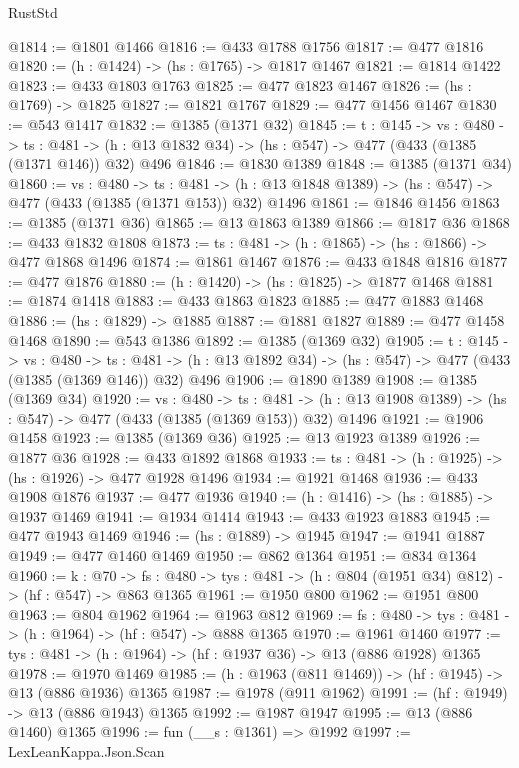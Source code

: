 \begin{lexlean}{RustStd}
\begin{coremodule}
@1814 := @1801 @1466
@1816 := @433 @1788 @1756
@1817 := @477 @1816
@1820 := (h : @1424) -> (hs : @1765) -> @1817 @1467
@1821 := @1814 @1422
@1823 := @433 @1803 @1763
@1825 := @477 @1823 @1467
@1826 := (hs : @1769) -> @1825
@1827 := @1821 @1767
@1829 := @477 @1456 @1467
@1830 := @543 @1417
@1832 := @1385 (@1371 @32)
@1845 := {t : @145} ->
  {vs : @480} ->
  {ts : @481} -> (h : @13 @1832 @34) -> (hs : @547) -> @477 (@433 (@1385 (@1371 @146)) @32) @496
@1846 := @1830 @1389
@1848 := @1385 (@1371 @34)
@1860 := {vs : @480} ->
  {ts : @481} -> (h : @13 @1848 @1389) -> (hs : @547) -> @477 (@433 (@1385 (@1371 @153)) @32) @1496
@1861 := @1846 @1456
@1863 := @1385 (@1371 @36)
@1865 := @13 @1863 @1389
@1866 := @1817 @36
@1868 := @433 @1832 @1808
@1873 := {ts : @481} -> (h : @1865) -> (hs : @1866) -> @477 @1868 @1496
@1874 := @1861 @1467
@1876 := @433 @1848 @1816
@1877 := @477 @1876
@1880 := (h : @1420) -> (hs : @1825) -> @1877 @1468
@1881 := @1874 @1418
@1883 := @433 @1863 @1823
@1885 := @477 @1883 @1468
@1886 := (hs : @1829) -> @1885
@1887 := @1881 @1827
@1889 := @477 @1458 @1468
@1890 := @543 @1386
@1892 := @1385 (@1369 @32)
@1905 := {t : @145} ->
  {vs : @480} ->
  {ts : @481} -> (h : @13 @1892 @34) -> (hs : @547) -> @477 (@433 (@1385 (@1369 @146)) @32) @496
@1906 := @1890 @1389
@1908 := @1385 (@1369 @34)
@1920 := {vs : @480} ->
  {ts : @481} -> (h : @13 @1908 @1389) -> (hs : @547) -> @477 (@433 (@1385 (@1369 @153)) @32) @1496
@1921 := @1906 @1458
@1923 := @1385 (@1369 @36)
@1925 := @13 @1923 @1389
@1926 := @1877 @36
@1928 := @433 @1892 @1868
@1933 := {ts : @481} -> (h : @1925) -> (hs : @1926) -> @477 @1928 @1496
@1934 := @1921 @1468
@1936 := @433 @1908 @1876
@1937 := @477 @1936
@1940 := (h : @1416) -> (hs : @1885) -> @1937 @1469
@1941 := @1934 @1414
@1943 := @433 @1923 @1883
@1945 := @477 @1943 @1469
@1946 := (hs : @1889) -> @1945
@1947 := @1941 @1887
@1949 := @477 @1460 @1469
@1950 := @862 @1364
@1951 := @834 @1364
@1960 := {k : @70} ->
  {fs : @480} -> {tys : @481} -> (h : @804 (@1951 @34) @812) -> (hf : @547) -> @863 @1365
@1961 := @1950 @800
@1962 := @1951 @800
@1963 := @804 @1962
@1964 := @1963 @812
@1969 := {fs : @480} -> {tys : @481} -> (h : @1964) -> (hf : @547) -> @888 @1365
@1970 := @1961 @1460
@1977 := {tys : @481} -> (h : @1964) -> (hf : @1937 @36) -> @13 (@886 @1928) @1365
@1978 := @1970 @1469
@1985 := (h : @1963 (@811 @1469)) -> (hf : @1945) -> @13 (@886 @1936) @1365
@1987 := @1978 (@911 @1962)
@1991 := (hf : @1949) -> @13 (@886 @1943) @1365
@1992 := @1987 @1947
@1995 := @13 (@886 @1460) @1365
@1996 := fun (__s : @1361) => @1992
@1997 := LexLeanKappa.Json.Scan

\end{coremodule}
\end{lexlean}
